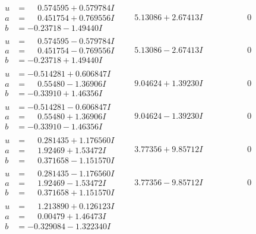 \documentclass[1p]{elsarticle_modified}
\theoremstyle{definition}
\begin{document}
$$\begin{array}{c|c|c}
\begin{aligned}
u &= \phantom{-}0.574595 + 0.579784 I \\
a &= \phantom{-}0.451754 + 0.769556 I \\
b &= -0.23718 - 1.49440 I\end{aligned}
 & \phantom{-}5.13086 + 2.67413 I & \phantom{-0.000000 } 0 \\ \hline\begin{aligned}
u &= \phantom{-}0.574595 - 0.579784 I \\
a &= \phantom{-}0.451754 - 0.769556 I \\
b &= -0.23718 + 1.49440 I\end{aligned}
 & \phantom{-}5.13086 - 2.67413 I & \phantom{-0.000000 } 0 \\ \hline\begin{aligned}
u &= -0.514281 + 0.606847 I \\
a &= \phantom{-}0.55480 - 1.36906 I \\
b &= -0.33910 + 1.46356 I\end{aligned}
 & \phantom{-}9.04624 + 1.39230 I & \phantom{-0.000000 } 0 \\ \hline\begin{aligned}
u &= -0.514281 - 0.606847 I \\
a &= \phantom{-}0.55480 + 1.36906 I \\
b &= -0.33910 - 1.46356 I\end{aligned}
 & \phantom{-}9.04624 - 1.39230 I & \phantom{-0.000000 } 0 \\ \hline\begin{aligned}
u &= \phantom{-}0.281435 + 1.176560 I \\
a &= \phantom{-}1.92469 + 1.53472 I \\
b &= \phantom{-}0.371658 - 1.151570 I\end{aligned}
 & \phantom{-}3.77356 + 9.85712 I & \phantom{-0.000000 } 0 \\ \hline\begin{aligned}
u &= \phantom{-}0.281435 - 1.176560 I \\
a &= \phantom{-}1.92469 - 1.53472 I \\
b &= \phantom{-}0.371658 + 1.151570 I\end{aligned}
 & \phantom{-}3.77356 - 9.85712 I & \phantom{-0.000000 } 0 \\ \hline\begin{aligned}
u &= \phantom{-}1.213890 + 0.126123 I \\
a &= \phantom{-}0.00479 + 1.46473 I \\
b &= -0.329084 - 1.322340 I\end{aligned}

\end{array}$$
\end{document}
